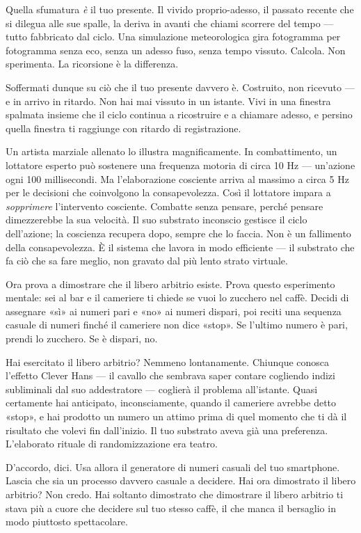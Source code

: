 \documentclass[11pt, twoside, openright]{book}
\begin{document}
Quella sfumatura \textit{è} il tuo presente. Il vivido proprio-adesso, il passato recente che si dilegua alle sue spalle, la deriva in avanti che chiami scorrere del tempo --- tutto fabbricato dal ciclo. Una simulazione meteorologica gira fotogramma per fotogramma senza eco, senza un adesso fuso, senza tempo vissuto. Calcola. Non sperimenta. La ricorsione è la differenza.

Soffermati dunque su ciò che il tuo presente davvero è. Costruito, non ricevuto --- e in arrivo in ritardo. Non hai mai vissuto in un istante. Vivi in una finestra spalmata insieme che il ciclo continua a ricostruire e a chiamare adesso, e persino quella finestra ti raggiunge con ritardo di registrazione.

Un artista marziale allenato lo illustra magnificamente. In combattimento, un lottatore esperto può sostenere una frequenza motoria di circa 10 Hz --- un'azione ogni 100 millisecondi. Ma l'elaborazione cosciente arriva al massimo a circa 5 Hz per le decisioni che coinvolgono la consapevolezza. Così il lottatore impara a \textit{sopprimere} l'intervento cosciente. Combatte senza pensare, perché pensare dimezzerebbe la sua velocità. Il suo substrato inconscio gestisce il ciclo dell'azione; la coscienza recupera dopo, sempre che lo faccia. Non è un fallimento della consapevolezza. È il sistema che lavora in modo efficiente --- il substrato che fa ciò che sa fare meglio, non gravato dal più lento strato virtuale.

Ora prova a dimostrare che il libero arbitrio esiste. Prova questo esperimento mentale: sei al bar e il cameriere ti chiede se vuoi lo zucchero nel caffè. Decidi di assegnare «sì» ai numeri pari e «no» ai numeri dispari, poi reciti una sequenza casuale di numeri finché il cameriere non dice «stop». Se l'ultimo numero è pari, prendi lo zucchero. Se è dispari, no.

Hai esercitato il libero arbitrio? Nemmeno lontanamente. Chiunque conosca l'effetto Clever Hans --- il cavallo che sembrava saper contare cogliendo indizi subliminali dal suo addestratore --- coglierà il problema all'istante. Quasi certamente hai anticipato, inconsciamente, quando il cameriere avrebbe detto «stop», e hai prodotto un numero un attimo prima di quel momento che ti dà il risultato che volevi fin dall'inizio. Il tuo substrato aveva già una preferenza. L'elaborato rituale di randomizzazione era teatro.

D'accordo, dici. Usa allora il generatore di numeri casuali del tuo smartphone. Lascia che sia un processo davvero casuale a decidere. Hai ora dimostrato il libero arbitrio? Non credo. Hai soltanto dimostrato che dimostrare il libero arbitrio ti stava più a cuore che decidere sul tuo stesso caffè, il che manca il bersaglio in modo piuttosto spettacolare.
\end{document}
